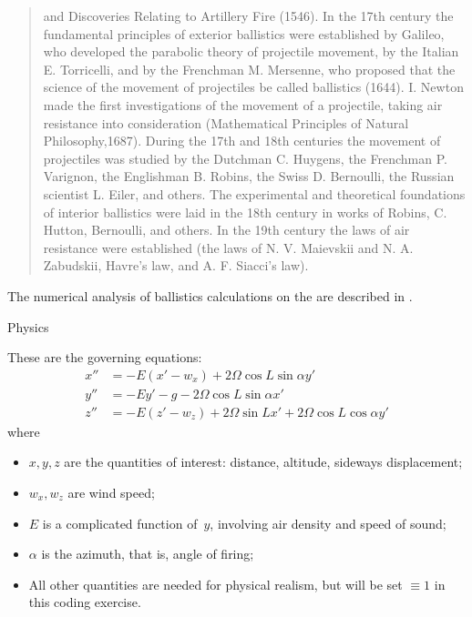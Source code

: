 \begin{quotation}
and Discoveries Relating to Artillery Fire (1546). In the 17th century
the fundamental principles of exterior ballistics were established by
Galileo, who developed the parabolic theory of projectile movement, by
the Italian E. Torricelli, and by the Frenchman M. Mersenne, who
proposed that the science of the movement of projectiles be called
ballistics (1644). I. Newton made the first investigations of the
movement of a projectile, taking air resistance into consideration
(Mathematical Principles of Natural Philosophy,1687). During the 17th
and 18th centuries the movement of projectiles was studied by the
Dutchman C. Huygens, the Frenchman P. Varignon, the Englishman
B. Robins, the Swiss D. Bernoulli, the Russian scientist L. Eiler, and
others. The experimental and theoretical foundations of interior
ballistics were laid in the 18th century in works of Robins,
C. Hutton, Bernoulli, and others. In the 19th century the laws of air
resistance were established (the laws of N. V. Maievskii and
N. A. Zabudskii, Havre’s law, and A. F. Siacci’s law).
\end{quotation}

The numerical analysis of ballistics calculations on the 
are described in \cite{eniac-firing}.

 {Physics}

These are the governing equations:
\begin{equation}
  \begin{array}{ll}
    x''&= -E(x'-w_x) + 2\Omega \cos L \sin \alpha y'\\
    y''&= -Ey' -g - 2\Omega \cos L \sin \alpha x'\\
    z''&= -E(z'-w_z) +2\Omega \sin L x' + 2\Omega \cos L \cos \alpha y'
  \end{array}
\end{equation}
where 
\begin{itemize}
\item $x,y,z$ are the quantities of interest: distance, altitude, sideways displacement;
\item $w_x,w_z$ are wind speed;
\item $E$ is a complicated function of~$y$, involving air density and speed of sound;
\item $\alpha$ is the azimuth, that is, angle of firing;
\item All other quantities are needed for physical realism, but will be set $\equiv1$
  in this coding exercise.
\end{itemize}

